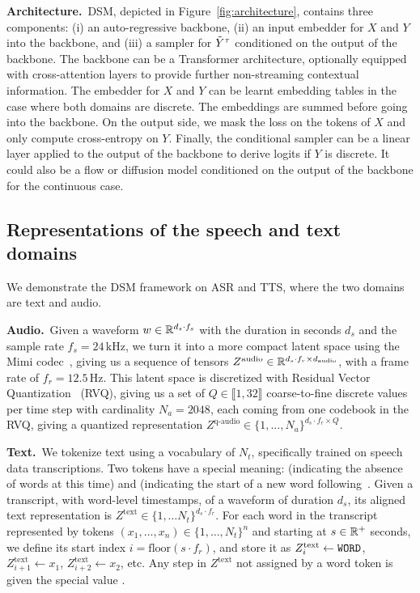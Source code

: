\textbf{Architecture.}\ DSM, depicted in Figure~\ref{fig:architecture}, contains three components:
(i) an auto-regressive backbone, (ii) an input embedder for $X$ and $Y$ into the backbone, and (iii) a sampler for $\tilde{Y}^\tau$ conditioned on the output of the backbone. 
The backbone can be a Transformer architecture, optionally equipped with cross-attention layers
to provide further non-streaming contextual information.
The embedder for $X$ and $Y$ can be learnt embedding tables in the case where both domains are discrete. The embeddings are summed before going into the backbone. On the output side, we mask the loss on the tokens of $X$ and only compute cross-entropy on $Y$. Finally, the conditional sampler can be a linear layer applied to the output of the backbone to derive logits if $Y$ is discrete. It could also be a flow or diffusion model conditioned on the output of the backbone for the continuous case.

\subsection{Representations of the speech and text domains}
\label{sec:representations}
We demonstrate the DSM framework on ASR and TTS, where the two domains are text and audio. %

\textbf{Audio.}\ 
Given a waveform $w \in \mathbb{R}^{d_s \cdot f_s}$ with the duration in seconds $d_s$ and the sample rate $f_s=24\,\text{kHz}$, we turn it into a more compact latent space using the Mimi codec~\citep{moshi}, giving us
a sequence of tensors $Z^\text{audio} \in \mathbb{R}^{d_s \cdot f_r \times d_{\text{audio}}}$, 
with a frame rate of $f_r=12.5\,\text{Hz}$.
This latent space is discretized with Residual Vector Quantization~\citep{soundstream} (RVQ), giving us
a set of $Q \in \llbracket 1, 32\rrbracket$ coarse-to-fine discrete values per time step with cardinality $N_a{=}2048$, each coming from one codebook in the RVQ, giving a quantized representation $Z^\text{q-audio} \in \{1, \ldots, N_a\}^{d_s \cdot f_r \times Q}$.


\textbf{Text.}\ 
We tokenize text using a vocabulary of $N_t$, specifically trained on speech data transcriptions.
Two tokens have a special meaning:  (indicating the absence of words at this time) and  (indicating the start of a new word following~\citet{moshi}.
Given a transcript, with word-level timestamps, of a waveform of duration $d_s$, its aligned text representation is $Z^\text{text}\in\{1, \ldots N_t\}^{d_s \cdot f_r}$.
For each word in the transcript represented by tokens $(x_1, \ldots, x_n) \in \{1, \ldots, N_t\}^n$ and starting at $s \in \mathbb{R}^+$ seconds, we
define its start index $i = \mathrm{floor}(s \cdot f_r)$, and store it as $Z^\text{text}_{i} \leftarrow \textsc{\ttfamily{}WORD}$, 
$Z^\text{text}_{i+1}\leftarrow x_1$, $Z^\text{text}_{i+2}\leftarrow x_2$, etc. Any step in $Z^\text{text}$ not assigned by a word token is given the special value . 

